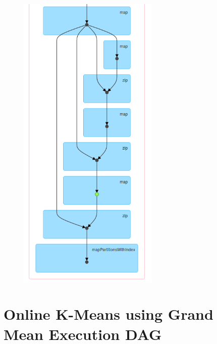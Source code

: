 \documentclass{l4proj}
\begin{document}
\begin{appendices}
\begin{figure}[H]
	\centering
    \label{fig:dag2}
    \includegraphics[width=0.60\textwidth]{images/DAG2}
\end{figure}

\section{Online K-Means using Grand Mean Execution DAG}


\end{appendices}
\end{document}
